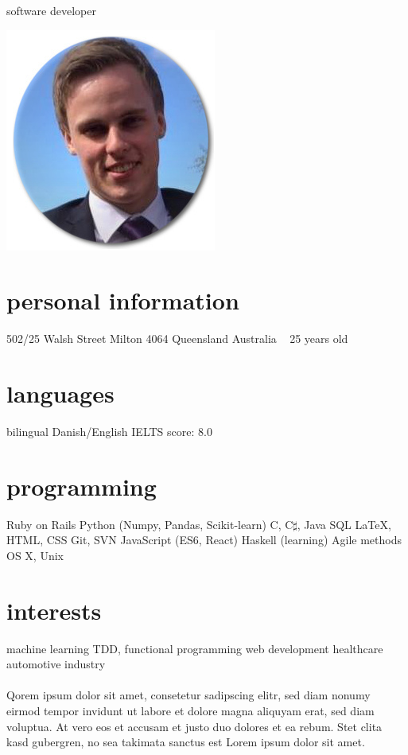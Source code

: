 \documentclass{afriggeri-cv/friggeri-cv}
\begin{document}
{software developer}

\begin{aside}
  \includegraphics[scale=0.4]{img/meg2.jpg}
  ~
  \section{personal information}
    502/25 Walsh Street
    Milton 4064
    Queensland
    Australia
    ~
    25 years old
    ~
    ~
    ~
  \section{languages}
    bilingual Danish/English
    IELTS score: 8.0
  \section{programming}
    Ruby on Rails
    Python (Numpy, Pandas, Scikit-learn)
    C, C$\sharp$, Java
    SQL
    \LaTeX, HTML, CSS
    Git, SVN
    JavaScript (ES6, React)
    Haskell (learning)
    Agile methods
    OS X, Unix
  \section{interests}
    machine learning
    TDD, functional programming
    web development
    healthcare
    automotive industry
\end{aside}

\paragraph{}
Qorem ipsum dolor sit amet, consetetur sadipscing elitr, sed diam nonumy eirmod
tempor invidunt ut labore et dolore magna aliquyam erat, sed diam voluptua. At
vero eos et accusam et justo duo dolores et ea rebum. Stet clita kasd gubergren,
no sea takimata sanctus est Lorem ipsum dolor sit amet.
\end{document}

